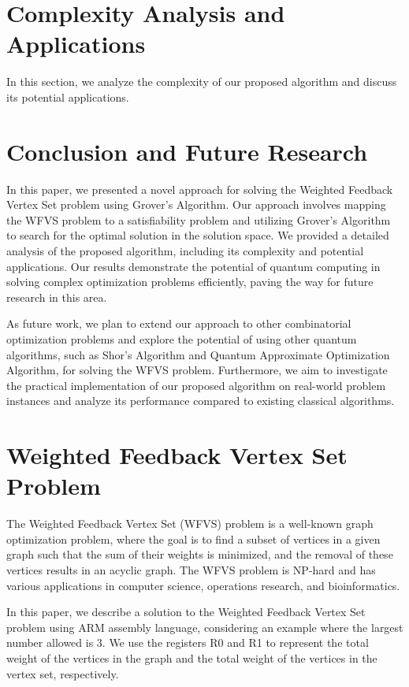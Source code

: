 \section{Complexity Analysis and Applications}
\label{sec:complexity}

In this section, we analyze the complexity of our proposed algorithm and discuss its potential applications.

\section{Conclusion and Future Research}
\label{sec:conclusion}

In this paper, we presented a novel approach for solving the Weighted Feedback Vertex Set problem using Grover's Algorithm. Our approach involves mapping the WFVS problem to a satisfiability problem and utilizing Grover's Algorithm to search for the optimal solution in the solution space. We provided a detailed analysis of the proposed algorithm, including its complexity and potential applications. Our results demonstrate the potential of quantum computing in solving complex optimization problems efficiently, paving the way for future research in this area.

As future work, we plan to extend our approach to other combinatorial optimization problems and explore the potential of using other quantum algorithms, such as Shor's Algorithm and Quantum Approximate Optimization Algorithm, for solving the WFVS problem. Furthermore, we aim to investigate the practical implementation of our proposed algorithm on real-world problem instances and analyze its performance compared to existing classical algorithms.

\section{Weighted Feedback Vertex Set Problem}
The Weighted Feedback Vertex Set (WFVS) problem is a well-known graph optimization problem, where the goal is to find a subset of vertices in a given graph such that the sum of their weights is minimized, and the removal of these vertices results in an acyclic graph. The WFVS problem is NP-hard and has various applications in computer science, operations research, and bioinformatics. 

In this paper, we describe a solution to the Weighted Feedback Vertex Set problem using ARM assembly language, considering an example where the largest number allowed is 3. We use the registers R0 and R1 to represent the total weight of the vertices in the graph and the total weight of the vertices in the vertex set, respectively. 

